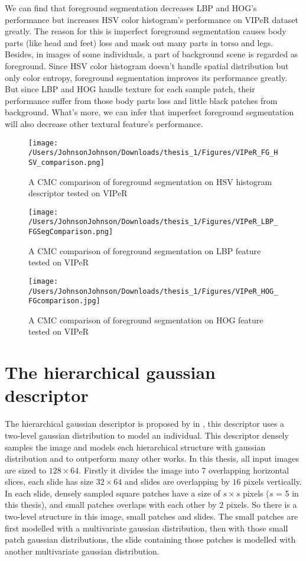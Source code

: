 We can find that foreground segmentation decreases LBP and HOG's performance but increases HSV color histogram's performance on VIPeR dataset greatly. The reason for this is imperfect foreground segmentation causes body parts (like head and feet) loss and mask out many parts in torso and legs. Besides, in images of some individuals, a part of background scene is regarded as foreground. Since HSV color histogram doesn't handle spatial distribution but only color entropy, foreground segmentation improves its performance greatly. But since LBP and HOG handle texture for each sample patch, their performance suffer from those body parts loss and little black patches from background. What's more, we can infer that imperfect foreground segmentation will also decrease other textural feature's performance.
\begin{figure}
\centering
\texttt{[image: /Users/JohnsonJohnson/Downloads/thesis\_1/Figures/VIPeR\_FG\_HSV\_comparison.png]}
\caption{A CMC comparison of foreground segmentation on HSV histogram descriptor tested on VIPeR}
\label{fig:SegHSV}
\vspace{-1em}
\end{figure} 

\begin{figure}
\centering
\texttt{[image: /Users/JohnsonJohnson/Downloads/thesis\_1/Figures/VIPeR\_LBP\_FGSegComparison.png]}
\caption{A CMC comparison of foreground segmentation on LBP feature tested on VIPeR }
\label{fig:SegLBP}
\vspace{-1em}
\end{figure} 

\begin{figure}
\centering
\texttt{[image: /Users/JohnsonJohnson/Downloads/thesis\_1/Figures/VIPeR\_HOG\_FGcomparison.jpg]}
\caption{A CMC comparison of foreground segmentation on HOG feature tested on VIPeR}
\label{fig:SegHOG}
\vspace{-1em}
\end{figure} 

\section{The hierarchical gaussian descriptor}

The hierarchical gaussian descriptor is proposed by in  \cite{GOG}, this descriptor uses a two-level gaussian distribution to model an individual. This descriptor densely samples the image and models each hierarchical structure with gaussian distribution and to outperform many other works. In this thesis, all input images are sized to $128\times 64$. Firstly it divides the image into 7 overlapping horizontal slices, each slide has size $32\times 64$ and slides are overlapping by $16$ pixels vertically.  In each slide, densely sampled square patches have a size of $s\times s$ pixels ($s$ = 5 in this thesis), and small patches overlaps with each other by $2$ pixels. So there is a  two-level structure in this image, small patches and slides. The small patches are first modelled with a multivariate gaussian distribution, then with those small patch gaussian distributions, the slide containing those patches is modelled with another multivariate gaussian distribution.

